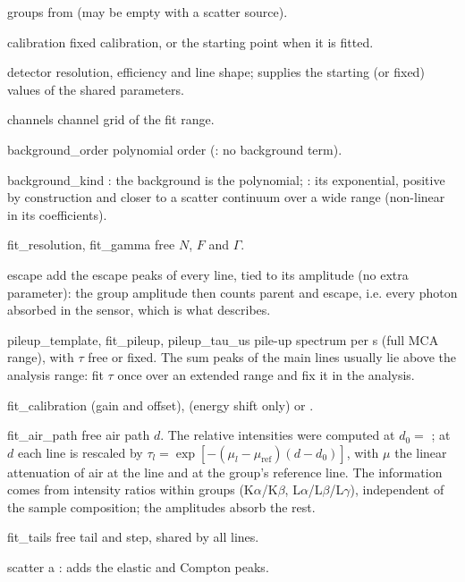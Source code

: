 \begin{args}
\item[groups] from  (may be empty with a scatter source).
\item[calibration] fixed calibration, or the starting point when it is fitted.
\item[detector] resolution, efficiency and line shape; supplies the starting (or fixed) values
  of the shared parameters.
\item[channels] channel grid of the fit range.
\item[background\_order] polynomial order (: no background term).
\item[background\_kind] : the background is the polynomial; : its
  exponential, positive by construction and closer to a scatter continuum over a wide range
  (non-linear in its coefficients).
\item[fit\_resolution, fit\_gamma] free $N$, $F$ and $\Gamma$.
\item[escape] add the escape peaks of every line, tied to its amplitude (no extra parameter):
  the group amplitude then counts parent and escape, i.e. every photon absorbed in the sensor,
  which is what  describes.
\item[pileup\_template, fit\_pileup, pileup\_tau\_us] pile-up spectrum per \textmu s (full MCA
  range), with $\tau$ free or fixed. The sum peaks of the main lines usually lie above the
  analysis range: fit $\tau$ once over an extended range and fix it in the analysis.
\item[fit\_calibration]  (gain and offset),  (energy shift only) or
  .
\item[fit\_air\_path] free air path $d$. The relative intensities were computed at $d_0 =$
  ; at $d$ each line is rescaled by
  $\tau_l = \exp[-(\mu_l-\mu_\mathrm{ref})(d-d_0)]$, with $\mu$ the linear attenuation of air
  at the line and at the group's reference line. The information comes from intensity ratios
  within groups (K$\alpha$/K$\beta$, L$\alpha$/L$\beta$/L$\gamma$), independent of the sample
  composition; the amplitudes absorb the rest.
\item[fit\_tails] free tail and step, shared by all lines.
\item[scatter] a : adds the elastic and Compton peaks.
\end{args}

